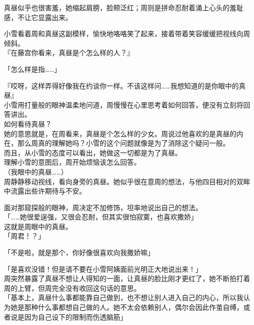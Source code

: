 真昼似乎也很害羞，她缩起肩膀，脸颊泛红；周则是拼命忍耐着涌上心头的羞耻感，不让它显露出来。

小雪看着周和真昼这副模样，愉快地咯咯笑了起来，接着带着笑容缓缓把视线向周倾斜。\\

『在藤宫你看来，真昼是个怎么样的人？』

「怎么样是指……」

『哎呀，这样弄得好像我在约谈你一样。不该这样问……我想知道的是你眼中的真昼』\\

小雪用打量般的眼神温柔地问道，周慢慢在心里思考着如何回答，便没有立刻将回答讲出。\\

如何看待真昼？\\

她的意思就是，在周看来，真昼是个怎么样的少女。周说过他喜欢的是真昼的内在，那么周真的理解她吗？小雪的这个问题就像是为了消除这个疑问一般。\\

而且，从小雪的态度可以看出，她做这一切都是为了真昼。\\

理解小雪的意图后，周开始烦恼该怎么回答。\\

（我眼中的真昼……）\\

周静静移动视线，看向身旁的真昼。她似乎很在意周的想法，与他四目相对的双眸中流露出些许期待与不安。

面对那窥探般的眼神，周决定不加修饰，坦率地说出自己的想法。\\

「……她很爱逞强，又很会忍耐，但其实很怕寂寞，也喜欢撒娇」\\

这就是周眼中的真昼。\\

「周君！？」

「不是啦，就是那个，你好像很喜欢向我撒娇嘛」

「是喜欢没错！但是请不要在小雪阿姨面前光明正大地说出来！」\\

周突然暴露了真昼不想让人得知的一面，让真昼的脸比刚才更红了，她不断拍打着周的上臂，但周完全没有收回这句话的意思。\\

「基本上，真昼什么事都能靠自己做到，也不想让别人进入自己的内心，所以我认为她是那种什么事都想自己做的人。她不太会依赖别人，偶尔会因此作茧自缚，或者说是因为自己设下的限制而伤透脑筋」\\

